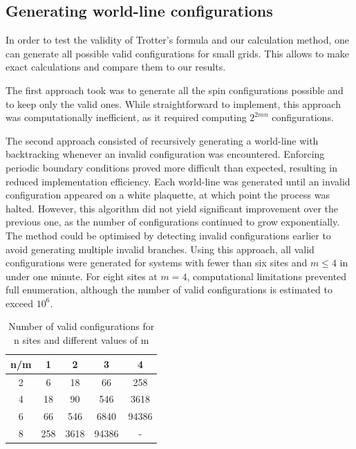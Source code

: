 \documentclass[a4paper]{article}
\begin{document}
\subsection{Generating world-line configurations}

In order to test the validity of Trotter's formula and our calculation method, one can generate all possible valid configurations for small grids. This allows to make exact calculations and compare them to our results.

The first approach took was to generate all the spin configurations possible and to keep only the valid ones. While straightforward to implement, this approach was computationally inefficient, as it required computing $2^{2 m n}$ configurations.

The second approach consisted of recursively generating a world-line with backtracking whenever an invalid configuration was encountered. Enforcing periodic boundary conditions proved more difficult than expected, resulting in reduced implementation efficiency. Each world-line was generated until an invalid configuration appeared on a white plaquette, at which point the process was halted. However, this algorithm did not yield significant improvement over the previous one, as the number of configurations continued to grow exponentially. The method could be optimised by detecting invalid configurations earlier to avoid generating multiple invalid branches. Using this approach, all valid configurations were generated for systems with fewer than six sites and $m \le 4$ in under one minute. For eight sites at $m = 4$, computational limitations prevented full enumeration, although the number of valid configurations is estimated to exceed $10^6$.

\begin{table}[!ht]
\centering
\begin{tabular}{|c || c | c | c | c|} 
 \hline
 n/m & 1 & 2 & 3 & 4 \\ [0.5ex] 
 \hline \hline
  2 & 6 & 18 & 66 & 258 \\
  \hline
 4 & 18 & 90 & 546 & 3618 \\ [1ex] 
 \hline
  6 & 66 & 546 & 6840 & 94386 \\ [1ex] 
 \hline
  8 & 258 & 3618 & 94386 & - \\ [1ex] 
 \hline
\end{tabular}
\caption{Number of valid configurations for n sites and different values of m}
\label{table:2}
\end{table}
\end{document}
